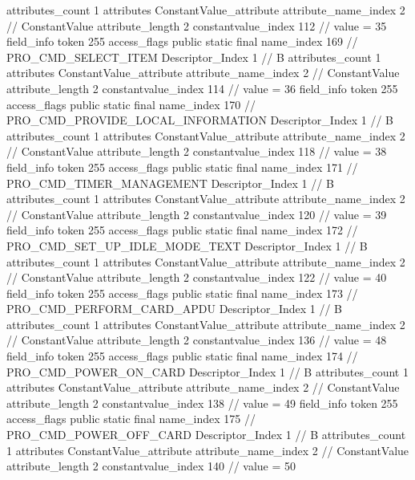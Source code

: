 {{{{{				attributes_count	1
				attributes {
				ConstantValue_attribute {
					attribute_name_index	2		// ConstantValue
					attribute_length	2
					constantvalue_index	112		// value = 35
				}
				}
			}
			field_info {
				token	255
				access_flags	public static final
				name_index	169		// PRO_CMD_SELECT_ITEM
				Descriptor_Index	1		// B
				attributes_count	1
				attributes {
				ConstantValue_attribute {
					attribute_name_index	2		// ConstantValue
					attribute_length	2
					constantvalue_index	114		// value = 36
				}
				}
			}
			field_info {
				token	255
				access_flags	public static final
				name_index	170		// PRO_CMD_PROVIDE_LOCAL_INFORMATION
				Descriptor_Index	1		// B
				attributes_count	1
				attributes {
				ConstantValue_attribute {
					attribute_name_index	2		// ConstantValue
					attribute_length	2
					constantvalue_index	118		// value = 38
				}
				}
			}
			field_info {
				token	255
				access_flags	public static final
				name_index	171		// PRO_CMD_TIMER_MANAGEMENT
				Descriptor_Index	1		// B
				attributes_count	1
				attributes {
				ConstantValue_attribute {
					attribute_name_index	2		// ConstantValue
					attribute_length	2
					constantvalue_index	120		// value = 39
				}
				}
			}
			field_info {
				token	255
				access_flags	public static final
				name_index	172		// PRO_CMD_SET_UP_IDLE_MODE_TEXT
				Descriptor_Index	1		// B
				attributes_count	1
				attributes {
				ConstantValue_attribute {
					attribute_name_index	2		// ConstantValue
					attribute_length	2
					constantvalue_index	122		// value = 40
				}
				}
			}
			field_info {
				token	255
				access_flags	public static final
				name_index	173		// PRO_CMD_PERFORM_CARD_APDU
				Descriptor_Index	1		// B
				attributes_count	1
				attributes {
				ConstantValue_attribute {
					attribute_name_index	2		// ConstantValue
					attribute_length	2
					constantvalue_index	136		// value = 48
				}
				}
			}
			field_info {
				token	255
				access_flags	public static final
				name_index	174		// PRO_CMD_POWER_ON_CARD
				Descriptor_Index	1		// B
				attributes_count	1
				attributes {
				ConstantValue_attribute {
					attribute_name_index	2		// ConstantValue
					attribute_length	2
					constantvalue_index	138		// value = 49
				}
				}
			}
			field_info {
				token	255
				access_flags	public static final
				name_index	175		// PRO_CMD_POWER_OFF_CARD
				Descriptor_Index	1		// B
				attributes_count	1
				attributes {
				ConstantValue_attribute {
					attribute_name_index	2		// ConstantValue
					attribute_length	2
					constantvalue_index	140		// value = 50
}}}}}}}
